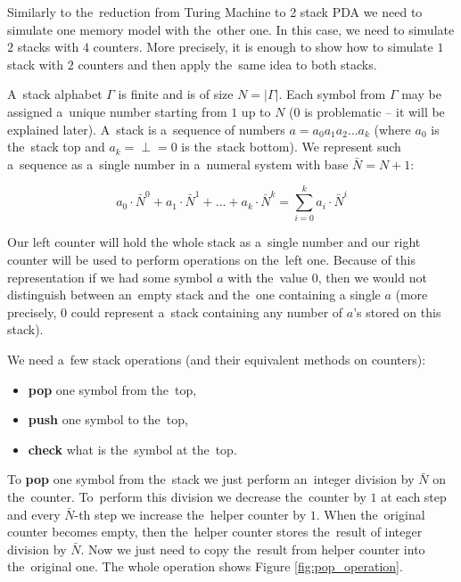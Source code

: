 \documentclass[english,shortabstract,mgr]{iithesis}
\begin{document}
Similarly to the~reduction from Turing Machine to 2 stack PDA we need to simulate
one memory model with the~other one. In this case, we need to simulate $2$ stacks
with $4$ counters. More precisely, it is enough to show how to simulate $1$ stack
with $2$ counters and then apply the~same idea to both stacks.

A~stack alphabet $\Gamma$ is finite and is of size $N = |\Gamma|$. Each symbol from $\Gamma$ may
be assigned a~unique number starting from $1$ up to $N$ ($0$ is problematic -- it will be
explained later). A~stack is a~sequence of numbers $a = a_0 a_1 a_2 \dots a_{k}$ (where $a_0$
is the~stack top and $a_k = \perp = 0$ is the~stack bottom). We represent such
a~sequence as a~single number in a~numeral system with base $\bar{N} = N+1$:

$$ a_0 \cdot \bar{N}^0 + a_1 \cdot \bar{N}^1 + \dots + a_{k} \cdot \bar{N}^{k}
    = \sum_{i=0}^{k} a_i \cdot \bar{N}^i $$

Our left counter will hold the whole stack as a~single number and our right counter will be used
to perform operations on the~left one. Because of this representation if we had some symbol $a$
with the~value $0$, then we would not distinguish between an~empty stack and the~one containing
a single $a$ (more precisely, $0$ could represent a~stack containing any number of $a$'s
stored on this stack).

We need a~few stack operations (and their equivalent
methods on counters):
\begin{itemize}
  \item \textbf{pop} one symbol from the~top,
  \item \textbf{push} one symbol to the~top,
  \item \textbf{check} what is the~symbol at the~top.
\end{itemize}

To \textbf{pop} one symbol from the~stack we just perform an~integer division by $\bar{N}$ on
the~counter. To~perform this division we decrease the~counter by $1$ at each step and every
$\bar{N}$-th step we increase the~helper counter by $1$. When the~original counter becomes empty,
then the~helper counter stores the~result of integer division by $\bar{N}$. Now we just
need to copy the~result from helper counter into the~original one. The whole operation shows
Figure \ref{fig:pop_operation}.
\end{document}
